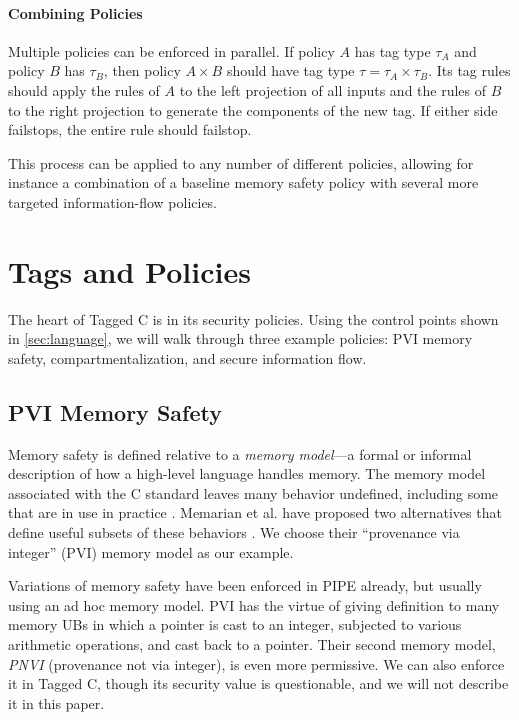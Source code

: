 \documentclass{llncs}
\begin{document}
\paragraph*{Combining Policies}

Multiple policies can be enforced in parallel. If policy \(A\) has tag type \(\tau_A\)
and policy \(B\) has \(\tau_B\), then policy \(A \times B\) should have tag type
\(\tau = \tau_A \times \tau_B\). Its tag rules should apply the rules of \(A\) to
the left projection of all inputs and the rules of \(B\) to the right projection
to generate the components of the new tag. If either side failstops, the entire
rule should failstop.

This process can be applied to any number of different policies, allowing for instance
a combination of a baseline memory safety policy with several more targeted
information-flow policies.

\section{Tags and Policies}
\label{sec:policies}

The heart of Tagged C is in its security policies. Using the control points shown in \cref{sec:language},
we will walk through three example policies: PVI memory safety, compartmentalization, and
secure information flow.

\subsection{PVI Memory Safety}
\label{sec:PVI}

Memory safety is defined relative to a {\em memory model}---a formal or informal description of
how a high-level language handles memory. The memory model associated with the C standard leaves
many behavior undefined, including some that are in use in practice \cite{Memarian16:DeFacto}.
Memarian et al. have proposed two alternatives that define useful subsets of these behaviors
\cite{Memarian19:ExploringCSemantics}. We choose their ``provenance via integer'' (PVI) memory model
as our example. 

Variations of memory safety have been enforced in PIPE already, but usually using
an ad hoc memory model. PVI has the virtue of giving definition to many memory UBs in which a pointer is
cast to an integer, subjected to various arithmetic operations, and cast back to a pointer.
Their second memory model, {\it PNVI} (provenance not via integer), is even more permissive.
We can also enforce it in Tagged C, though its security value is questionable, and we will
not describe it in this paper.
\end{document}
